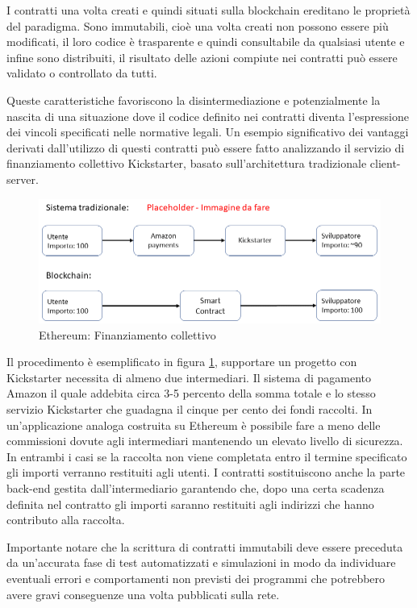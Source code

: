 I contratti una volta creati e quindi situati sulla blockchain ereditano le proprietà del paradigma. Sono immutabili, cioè una volta creati non possono essere più modificati, il loro codice è trasparente e quindi consultabile da qualsiasi utente e infine sono distribuiti, il risultato delle azioni compiute nei contratti può essere validato o controllato da tutti.

Queste caratteristiche favoriscono la disintermediazione e potenzialmente la nascita di una situazione dove il codice definito nei contratti diventa l’espressione dei vincoli specificati nelle normative legali. Un esempio significativo dei vantaggi derivati dall'utilizzo di questi contratti può essere fatto analizzando il servizio  di finanziamento collettivo Kickstarter, basato sull'architettura tradizionale client-server.
\\
\begin{figure}[H]
\centering
\includegraphics[width=1\textwidth]{immagini/kickstarter.png}
\caption{Ethereum: Finanziamento collettivo}
\label{fig:Kickstarter}
\end{figure}

Il procedimento è esemplificato in figura \ref{fig:Kickstarter}, supportare un progetto con Kickstarter necessita di almeno due intermediari. Il sistema di pagamento Amazon il quale addebita circa 3-5 percento della somma totale e lo stesso servizio Kickstarter che guadagna il cinque per cento dei fondi raccolti. In un'applicazione analoga costruita su Ethereum è possibile fare a meno delle commissioni dovute agli intermediari mantenendo un elevato livello di sicurezza. In entrambi i casi se la raccolta non viene completata entro il termine specificato gli importi verranno restituiti agli utenti. I contratti sostituiscono anche la parte back-end gestita dall'intermediario garantendo che, dopo una certa scadenza definita nel contratto gli importi saranno restituiti agli indirizzi che hanno contributo alla raccolta. 

Importante notare che la scrittura di contratti immutabili deve essere preceduta da un’accurata fase di test automatizzati e simulazioni in modo da individuare eventuali errori e comportamenti non previsti dei programmi che potrebbero avere gravi conseguenze una volta pubblicati sulla rete.

